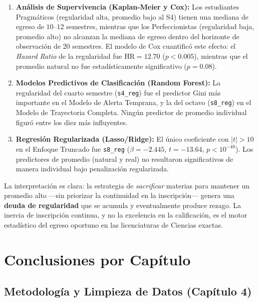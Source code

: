 \begin{enumerate}
    \item \textbf{Análisis de Supervivencia (Kaplan-Meier y Cox):} Los estudiantes Pragmáticos
          (regularidad alta, promedio bajo al S4) tienen una mediana de egreso de
          $10$--$12$ semestres, mientras que los Perfeccionistas (regularidad baja, promedio alto)
          no alcanzan la mediana de egreso dentro del horizonte de observación de 20 semestres.
          El modelo de Cox cuantificó este efecto: el \emph{Hazard Ratio} de la regularidad
          fue $\text{HR} = 12.70$ ($p < 0.005$), mientras que el promedio natural no fue
          estadísticamente significativo ($p = 0.08$).

    \item \textbf{Modelos Predictivos de Clasificación (Random Forest):} La regularidad del
          cuarto semestre (\texttt{s4\_reg}) fue el predictor Gini más importante en el Modelo
          de Alerta Temprana, y la del octavo (\texttt{s8\_reg}) en el Modelo de Trayectoria
          Completa. Ningún predictor de promedio individual figuró entre los diez más influyentes.

    \item \textbf{Regresión Regularizada (Lasso/Ridge):} El único coeficiente con $|t| > 10$
          en el Enfoque Truncado fue \texttt{s8\_reg} ($\beta = -2.445$, $t = -13.64$,
          $p < 10^{-40}$). Los predictores de promedio (natural y real) no resultaron
          significativos de manera individual bajo penalización regularizada.
\end{enumerate}

\noindent
La interpretación es clara: la estrategia de \emph{sacrificar} materias para mantener un
promedio alto —sin priorizar la continuidad en la inscripción— genera una \textbf{deuda de
regularidad} que se acumula y eventualmente produce rezago. La inercia de inscripción
continua, y no la excelencia en la calificación, es el motor estadístico del egreso oportuno
en las licenciaturas de Ciencias exactas.

\section{Conclusiones por Capítulo}

\subsection{Metodología y Limpieza de Datos (Capítulo 4)}

